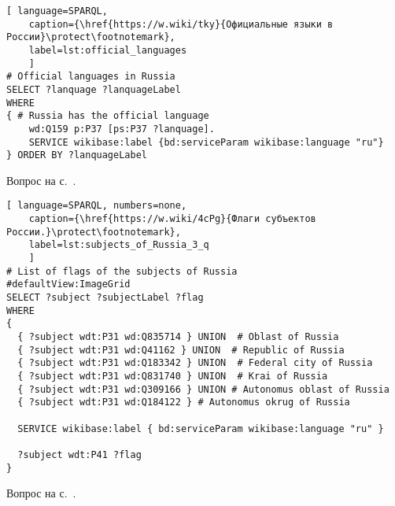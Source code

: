\begin{task}
	\label{answer:official_language}
	
	\begin{lstlisting}[ language=SPARQL, 
	caption={\href{https://w.wiki/tky}{Официальные языки в России}\protect\footnotemark},
	label=lst:official_languages
	]
# Official languages in Russia
SELECT ?lanquage ?lanquageLabel
WHERE
{ # Russia has the official language
	wd:Q159 p:P37 [ps:P37 ?lanquage].
	SERVICE wikibase:label {bd:serviceParam wikibase:language "ru"}
} ORDER BY ?lanquageLabel
	\end{lstlisting}
	
	\small{Вопрос на с.~\pageref{lst:List_of_historical_countries}.}
\end{task}


\begin{task}
	\label{answer:subjects_of_Russia_3}
	
	\begin{lstlisting}[ language=SPARQL, numbers=none,
	caption={\href{https://w.wiki/4cPg}{Флаги субъектов России.}\protect\footnotemark},
	label=lst:subjects_of_Russia_3_q
	]
# List of flags of the subjects of Russia
#defaultView:ImageGrid
SELECT ?subject ?subjectLabel ?flag
WHERE
{
  { ?subject wdt:P31 wd:Q835714 } UNION  # Oblast of Russia
  { ?subject wdt:P31 wd:Q41162 } UNION  # Republic of Russia
  { ?subject wdt:P31 wd:Q183342 } UNION  # Federal city of Russia
  { ?subject wdt:P31 wd:Q831740 } UNION  # Krai of Russia
  { ?subject wdt:P31 wd:Q309166 } UNION # Autonomus oblast of Russia
  { ?subject wdt:P31 wd:Q184122 } # Autonomus okrug of Russia
  
  SERVICE wikibase:label { bd:serviceParam wikibase:language "ru" }
   
  ?subject wdt:P41 ?flag
}
\end{lstlisting}
	
\small{Вопрос на с.~\pageref{lst:oblast-of-Russia}.}
\end{task}

